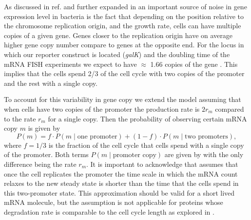 As discussed in ref. \cite{Jones2014a} and further expanded in
\cite{Peterson2015} an important source of noise in gene expression level in
bacteria is the fact that depending on the position relative to the chromosome
replication origin, and the growth rate, cells can have multiple copies of a
given gene. Genes closer to the replication origin have on average higher gene
copy number compare to genes at the opposite end. For the locus in which our
reporter construct is located (\textit{galK}) and the doubling time of the mRNA
FISH experiments we expect to have $\approx$ 1.66 copies of the gene
\cite{Bremer1996}. This implies that the cells spend 2/3 of the cell cycle with
two copies of the promoter and the rest with a single copy.

To account for this variability in gene copy we extend the model assuming that
when cells have two copies of the promoter the production rate is $2 r_m$
compared to the rate $r_m$ for a single copy. Then the probability of observing
certain mRNA copy $m$ is given by
\begin{equation}
  P(m) = f \cdot P(m \mid \text{one promoter}) +
  (1 - f) \cdot P(m \mid \text{two promoters}),
  \label{seq_prob_multipromoter}
\end{equation}
where $f = 1/3$ is the fraction of the cell cycle that cells spend with a single
copy of the promoter. Both terms $P(m \mid \text{promoter copy})$ are given by
 with the only difference being the rate $r_m$. It is
important to acknowledge that  assumes that once
the cell replicates the promoter the time scale in which the mRNA count relaxes
to the new steady state is shorter than the time that the cells spend in this
two-promoter state. This approximation should be valid for a short lived mRNA
molecule, but the assumption is not applicable for proteins whose degradation
rate is comparable to the cell cycle length as explored in
.

